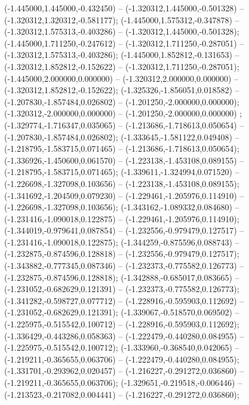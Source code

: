  (-1.445000,1.445000,-0.432450) -- (-1.320312,1.445000,-0.501328) -- (-1.320312,1.320312,-0.581177);
 (-1.445000,1.575312,-0.347878) -- (-1.320312,1.575313,-0.403286) -- (-1.320312,1.445000,-0.501328);
 (-1.445000,1.711250,-0.247612) -- (-1.320312,1.711250,-0.287051) -- (-1.320312,1.575313,-0.403286);
 (-1.445000,1.852812,-0.131653) -- (-1.320312,1.852812,-0.152622) -- (-1.320312,1.711250,-0.287051);
 (-1.445000,2.000000,0.000000) -- (-1.320312,2.000000,0.000000) -- (-1.320312,1.852812,-0.152622);
 (-1.325326,-1.856051,0.018582) -- (-1.207830,-1.857484,0.026802) -- (-1.201250,-2.000000,0.000000);
 (-1.320312,-2.000000,0.000000) -- (-1.201250,-2.000000,0.000000) ;
 (-1.329774,-1.716347,0.035065) -- (-1.213686,-1.718613,0.050654) -- (-1.207830,-1.857484,0.026802);
 (-1.333645,-1.581122,0.049408) -- (-1.218795,-1.583715,0.071465) -- (-1.213686,-1.718613,0.050654);
 (-1.336926,-1.450600,0.061570) -- (-1.223138,-1.453108,0.089155) -- (-1.218795,-1.583715,0.071465);
 (-1.339611,-1.324994,0.071520) -- (-1.226698,-1.327098,0.103656) -- (-1.223138,-1.453108,0.089155);
 (-1.341692,-1.204509,0.079230) -- (-1.229461,-1.205976,0.114910) -- (-1.226698,-1.327098,0.103656);
 (-1.343162,-1.089332,0.084680) -- (-1.231416,-1.090018,0.122875) -- (-1.229461,-1.205976,0.114910);
 (-1.344019,-0.979641,0.087854) -- (-1.232556,-0.979479,0.127517) -- (-1.231416,-1.090018,0.122875);
 (-1.344259,-0.875596,0.088743) -- (-1.232875,-0.874596,0.128818) -- (-1.232556,-0.979479,0.127517);
 (-1.343882,-0.777345,0.087346) -- (-1.232373,-0.775582,0.126773) -- (-1.232875,-0.874596,0.128818);
 (-1.342888,-0.685017,0.083665) -- (-1.231052,-0.682629,0.121391) -- (-1.232373,-0.775582,0.126773);
 (-1.341282,-0.598727,0.077712) -- (-1.228916,-0.595903,0.112692) -- (-1.231052,-0.682629,0.121391);
 (-1.339067,-0.518570,0.069502) -- (-1.225975,-0.515542,0.100712) -- (-1.228916,-0.595903,0.112692);
 (-1.336429,-0.443286,0.058363) -- (-1.222479,-0.440280,0.084955) -- (-1.225975,-0.515542,0.100712);
 (-1.333960,-0.368540,0.042065) -- (-1.219211,-0.365655,0.063706) -- (-1.222479,-0.440280,0.084955);
 (-1.331701,-0.293962,0.020457) -- (-1.216227,-0.291272,0.036860) -- (-1.219211,-0.365655,0.063706);
 (-1.329651,-0.219518,-0.006446) -- (-1.213523,-0.217082,0.004441) -- (-1.216227,-0.291272,0.036860);
